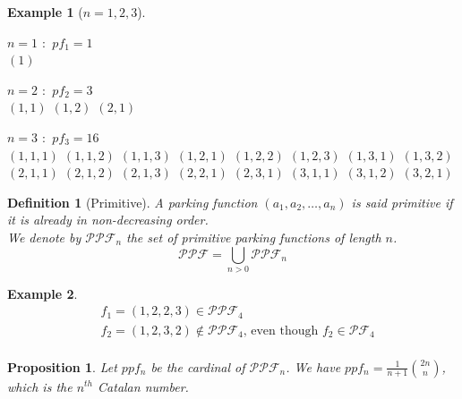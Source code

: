 \documentclass[12pt]{article}
\newtheorem*{prop}{Proposition}
\newtheorem{definition}{Definition}
\newtheorem*{example}{Example}
\begin{document}
\begin{example}[$n = 1, 2, 3$]
    \text{} \\
    \begin{itemize*}
            \item $n = 1$ \text{ } $:$ \text{ } $pf_1 = 1$\\
            \subitem $(1)$\\
            \item $n = 2$ \text{ } $:$ \text{ } $pf_2 = 3$\\
            \subitem $(1, 1)$
            \subitem $(1, 2)$
            \subitem $(2, 1)$\\
            \item $n = 3$ \text{ } $:$ \text{ } $pf_3 = 16$\\
            \subitem $(1, 1, 1)$
            \subitem $(1, 1, 2)$
            \subitem $(1, 1, 3)$
            \subitem $(1, 2, 1)$
            \subitem $(1, 2, 2)$
            \subitem $(1, 2, 3)$
            \subitem $(1, 3, 1)$
            \subitem $(1, 3, 2)$
            \subitem $(2, 1, 1)$
            \subitem $(2, 1, 2)$
            \subitem $(2, 1, 3)$
            \subitem $(2, 2, 1)$
            \subitem $(2, 3, 1)$
            \subitem $(3, 1, 1)$
            \subitem $(3, 1, 2)$
            \subitem $(3, 2, 1)$\\
    \end{itemize*}
\end{example}

\begin{definition}[Primitive]
    A parking function $(a_1, a_2, \ldots, a_n)$ is said \emph{primitive} if
    it is already in non-decreasing order. \\
    We denote by $\mathcal{PPF}_n$ the set of primitive parking functions of length $n$.
    $$\mathcal{PPF} = \bigcup_{n > 0}{\mathcal{PPF}_n}$$
    
\end{definition}

\begin{example}
    \begin{align*}
        &f_1 = (1, 2, 2, 3) \in \mathcal{PPF}_4\\
        &f_2 = (1, 2, 3, 2) \notin \mathcal{PPF}_4
         \text{, even though } f_2 \in \mathcal{PF}_4\\
    \end{align*}
\end{example}

\begin{prop}
    Let $ppf_n$ be the cardinal of $\mathcal{PPF}_n$.
    We have $ppf_n = \frac{1}{n + 1} \binom{2n}{n}$,
    which is the $n^{th}$ Catalan number.
\end{prop}
\end{document}

